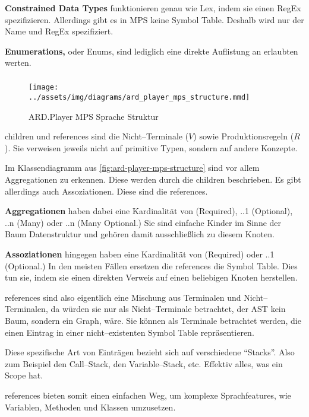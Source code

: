 \textbf{Constrained Data Types} funktionieren genau wie Lex, indem sie einen \ac{RegEx} spezifizieren.
Allerdings gibt es in \ac{MPS} keine Symbol Table.
Deshalb wird nur der Name und \ac{RegEx} spezifiziert.

\textbf{Enumerations,} oder Enums, sind lediglich eine direkte Auflistung an erlaubten werten.

\subparagraph*{}
\begin{figure}
    \texttt{[image: ../assets/img/diagrams/ard\_player\_mps\_structure.mmd]}
    \caption{\acs{ARD}.Player MPS Sprache Struktur}
    \label{fig:ard-player-mps-structure}
\end{figure}
{\ttfamily children} und {\ttfamily references} sind die Nicht--Terminale ($V$) sowie Produktionsregeln ($R$).
Sie verweisen jeweils nicht auf primitive Typen, sondern auf andere Konzepte.

Im Klassendiagramm aus \autoref{fig:ard-player-mps-structure} sind vor allem Aggregationen zu erkennen.
Diese werden durch die {\ttfamily children} beschrieben.
Es gibt allerdings auch Assoziationen.
Diese sind die {\ttfamily references}.

\textbf{Aggregationen} haben dabei eine Kardinalität von {} (Required), {..1} (Optional), {..n} (Many) oder {..n} (Many Optional.)
Sie sind einfache Kinder im Sinne der Baum Datenstruktur und gehören damit ausschließlich zu diesem Knoten.

\textbf{Assoziationen} hingegen haben eine Kardinalität von {} (Required) oder {..1} (Optional.)
In den meisten Fällen ersetzen die {\ttfamily references} die Symbol Table.
Dies tun sie, indem sie einen direkten Verweis auf einen beliebigen Knoten herstellen.

{\ttfamily references} sind also eigentlich eine Mischung aus Terminalen und Nicht--Terminalen, da würden sie nur als Nicht--Terminale betrachtet, der \ac{AST} kein Baum, sondern ein Graph, wäre.
Sie können als Terminale betrachtet werden, die einen Eintrag in einer nicht--existenten Symbol Table repräsentieren.

Diese spezifische Art von Einträgen bezieht sich auf verschiedene \enquote{Stacks}.
Also zum Beispiel den Call--Stack, den Variable--Stack, etc.
Effektiv alles, was ein Scope hat.

{\ttfamily references} bieten somit einen einfachen Weg, um komplexe Sprachfeatures, wie Variablen, Methoden und Klassen umzusetzen.


